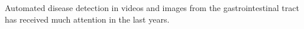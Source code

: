 Automated disease detection in videos and images from the gastrointestinal tract has received much attention in the last years.
